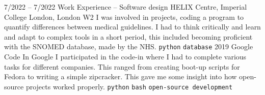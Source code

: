 \documentclass[9pt]{developercv} %
\begin{document}
\vspace{-10 pt}
\begin{entrylist}
	\entry
	{7/2022 -- 7/2022}
	{Work Experience – Software design}
	{HELIX Centre, Imperial College London, London W2}
	{
		I was involved in projects, coding a program to quantify differences between medical guidelines.
		I had to think critically and learn and adapt to complex tools in a short period, this included becoming proficient with the SNOMED database, made by the NHS. 
		\newline
		\texttt{python} \slashsep \texttt{database}
	}
	\entry
        {2019}
		{Google Code In}
		{Google}
		{
			I participated in the code-in where I had to complete various tasks for different companies. 
			This ranged from creating boot-up scripts for Fedora to writing a simple zipcracker. 
			This gave me some insight into how open-source projects worked properly. 
        	\newline
			\texttt{python} \slashsep \texttt{bash} \slashsep \texttt{open-source development}
		}
		
\end{entrylist}
\end{document}
